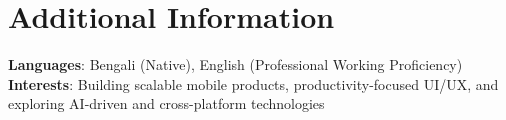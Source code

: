 \documentclass[letterpaper,11pt]{article}
\begin{document}
\section{Additional Information}
 \begin{itemize}[leftmargin=0.15in, label={}]
    \small{\item{
     \textbf{Languages}{: Bengali (Native), English (Professional Working Proficiency)} \\
     \textbf{Interests}{: Building scalable mobile products, productivity-focused UI/UX, and exploring AI-driven and cross-platform technologies}
    }}
 \end{itemize}

\end{document}
